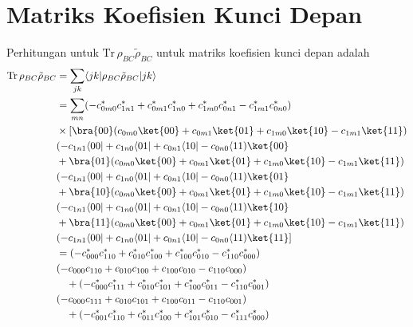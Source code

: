 \chapter{Matriks Koefisien Kunci Depan}
Perhitungan untuk $\mathrm{Tr}\,\rho_{BC} \tilde{\rho}_{BC}$ untuk matriks koefisien kunci depan adalah
\begin{equation}
	\begin{aligned}
		\mathrm{Tr}\,\rho_{BC} \tilde{\rho}_{BC}
		&= \sum_{j k}
		\langle j k |
		\rho_{BC} \tilde{\rho}_{BC}
		| j k \rangle \\
		&= \sum_{m n}
		(- c^{*}_{0m0} c^{*}_{1n1}
		+ c^{*}_{0m1} c^{*}_{1n0}
		+ c^{*}_{1m0} c^{*}_{0n1}
		- c^{*}_{1m1} c^{*}_{0n0})\\
		&\times[\bra{00}(c_{0m0} \ket{00}
		+ c_{0m1} \ket{01}
		+ c_{1m0} \ket{10}
		- c_{1m1} \ket{11})\\
		&(- c_{1n1} \langle 00|
		+ c_{1n0} \langle 01|
		+ c_{0n1} \langle 10|
		- c_{0n0} \langle 11)\ket{00}\\
		&+\bra{01}(c_{0m0} \ket{00}
		+ c_{0m1} \ket{01}
		+ c_{1m0} \ket{10}
		- c_{1m1} \ket{11})\\
		&(- c_{1n1} \langle 00|
		+ c_{1n0} \langle 01|
		+ c_{0n1} \langle 10|
		- c_{0n0} \langle 11)\ket{01}\\
		&+\bra{10}(c_{0m0} \ket{00}
		+ c_{0m1} \ket{01}
		+ c_{1m0} \ket{10}
		- c_{1m1} \ket{11})\\
		&(- c_{1n1} \langle 00|
		+ c_{1n0} \langle 01|
		+ c_{0n1} \langle 10|
		- c_{0n0} \langle 11)\ket{10}\\
		&+\bra{11}(c_{0m0} \ket{00}
		+ c_{0m1} \ket{01}
		+ c_{1m0} \ket{10}
		- c_{1m1} \ket{11})\\
		&(- c_{1n1} \langle 00|
		+ c_{1n0} \langle 01|
		+ c_{0n1} \langle 10|
		- c_{0n0} \langle 11)\ket{11}]\\
		&= (-c^{*}_{000} c^{*}_{110}
		+ c^{*}_{010} c^{*}_{100}
		+ c^{*}_{100} c^{*}_{010}
		- c^{*}_{110} c^{*}_{000})\\
		&(-c_{000} c_{110}
		+ c_{010} c_{100}
		+ c_{100} c_{010}
		- c_{110} c_{000}) \\
		&\quad + (-c^{*}_{000} c^{*}_{111}
		+ c^{*}_{010} c^{*}_{101}
		+ c^{*}_{100} c^{*}_{011}
		- c^{*}_{110} c^{*}_{001})\\
		&(-c_{000} c_{111}
		+ c_{010} c_{101}
		+ c_{100} c_{011}
		- c_{110} c_{001}) \\
		&\quad + (-c^{*}_{001} c^{*}_{110}
		+ c^{*}_{011} c^{*}_{100}
		+ c^{*}_{101} c^{*}_{010}
		- c^{*}_{111} c^{*}_{000})\\

\end{aligned}
\end{equation}
